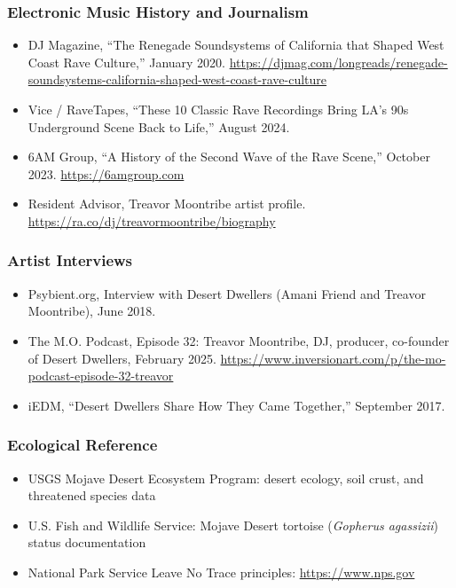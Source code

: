 \documentclass[11pt,letterpaper]{article}
\begin{document}
\subsubsection{Electronic Music History and Journalism}

\begin{itemize}[nosep]
  \item DJ Magazine, ``The Renegade Soundsystems of California that Shaped West Coast Rave Culture,'' January 2020. \url{https://djmag.com/longreads/renegade-soundsystems-california-shaped-west-coast-rave-culture}
  \item Vice / RaveTapes, ``These 10 Classic Rave Recordings Bring LA's 90s Underground Scene Back to Life,'' August 2024.
  \item 6AM Group, ``A History of the Second Wave of the Rave Scene,'' October 2023. \url{https://6amgroup.com}
  \item Resident Advisor, Treavor Moontribe artist profile. \url{https://ra.co/dj/treavormoontribe/biography}
\end{itemize}

\subsubsection{Artist Interviews}

\begin{itemize}[nosep]
  \item Psybient.org, Interview with Desert Dwellers (Amani Friend and Treavor Moontribe), June 2018.
  \item The M.O. Podcast, Episode 32: Treavor Moontribe, DJ, producer, co-founder of Desert Dwellers, February 2025. \url{https://www.inversionart.com/p/the-mo-podcast-episode-32-treavor}
  \item iEDM, ``Desert Dwellers Share How They Came Together,'' September 2017.
\end{itemize}

\subsubsection{Ecological Reference}

\begin{itemize}[nosep]
  \item USGS Mojave Desert Ecosystem Program: desert ecology, soil crust, and threatened species data
  \item U.S. Fish and Wildlife Service: Mojave Desert tortoise (\textit{Gopherus agassizii}) status documentation
  \item National Park Service Leave No Trace principles: \url{https://www.nps.gov}
\end{itemize}
\end{document}
